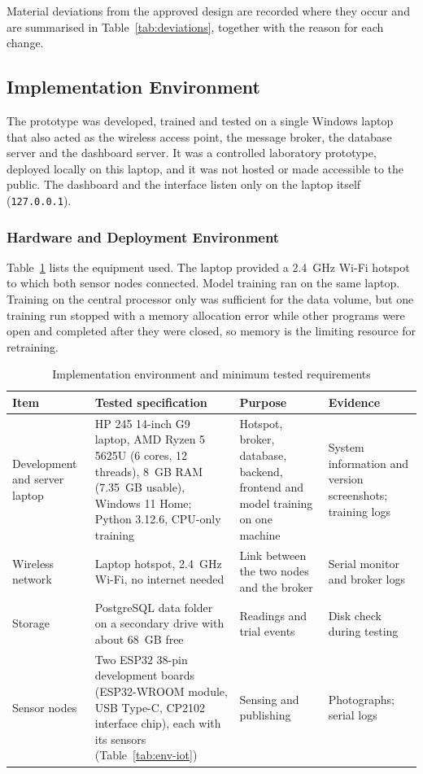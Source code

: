 \documentclass[12pt, a4paper]{article}
\begin{document}
Material deviations from the approved design are recorded where they occur and are summarised in Table~\ref{tab:deviations}, together with the reason for each change.

\subsection{Implementation Environment}
\label{sec:environment}

The prototype was developed, trained and tested on a single Windows laptop that also acted as the wireless access point, the message broker, the database server and the dashboard server. It was a controlled laboratory prototype, deployed locally on this laptop, and it was not hosted or made accessible to the public. The dashboard and the interface listen only on the laptop itself (\texttt{127.0.0.1}).

\subsubsection{Hardware and Deployment Environment}

Table~\ref{tab:env-hw} lists the equipment used. The laptop provided a 2.4~GHz Wi-Fi hotspot to which both sensor nodes connected. Model training ran on the same laptop. Training on the central processor only was sufficient for the data volume, but one training run stopped with a memory allocation error while other programs were open and completed after they were closed, so memory is the limiting resource for retraining.

\begin{table}[H]
\centering

\begin{tabular}{|p{2.6cm}|p{4.2cm}|p{4.0cm}|p{3.2cm}|}
\hline
\textbf{Item} & \textbf{Tested specification} & \textbf{Purpose} & \textbf{Evidence} \\
\hline
Development and server laptop & HP 245 14-inch G9 laptop, AMD Ryzen 5 5625U (6 cores, 12 threads), 8~GB RAM (7.35~GB usable), Windows 11 Home; Python 3.12.6, CPU-only training & Hotspot, broker, database, backend, frontend and model training on one machine & System information and version screenshots; training logs \\
\hline
Wireless network & Laptop hotspot, 2.4~GHz Wi-Fi, no internet needed & Link between the two nodes and the broker & Serial monitor and broker logs \\
\hline
Storage & PostgreSQL data folder on a secondary drive with about 68~GB free & Readings and trial events & Disk check during testing \\
\hline
Sensor nodes & Two ESP32 38-pin development boards (ESP32-WROOM module, USB Type-C, CP2102 interface chip), each with its sensors (Table~\ref{tab:env-iot}) & Sensing and publishing & Photographs; serial logs \\
\hline
\end{tabular}
\caption{Implementation environment and minimum tested requirements}
\label{tab:env-hw}
\end{table}
\end{document}
